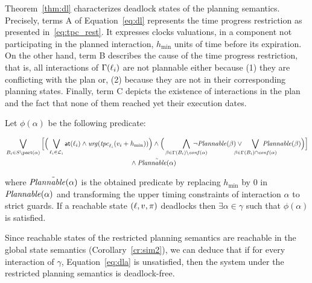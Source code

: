 Theorem~\ref{thm:dl} characterizes deadlock states of the planning semantics. Precisely,
terms A of Equation~\ref{eq:dl} represents the time progress restriction as presented
in~\ref{eq:tpc_rest}. It expresses clocks valuations, in a component not participating 
in the planned interaction, $h_{\min}$ units of time before its expiration. On the other hand,
term B describes the cause of the time progress restriction, that is, all interactions
of $\Gamma(\ell_i)$ are not plannable either because (1) they are conflicting with the plan
or, (2) because they are not in their corresponding planning states.
Finally, term C depicts the existence of interactions in the plan and the fact that none of them
reached yet their execution dates.
 
\begin{theorem}\label{thm:dla}
  Let $\phi(\alpha)$ be the following predicate:

  \begin{adjustwidth}{-10mm}{-10mm}
    \begin{equation}\label{eq:dla}
  \begin{split}
    &\bigvee_{B_i\in S\setminus\p{\alpha}}\Big[\Big(
    \bigvee_{\loc_i\in\Loc_i}\at{\loc_i}
  \wedge\urg(\tpc{\loc_i}(\val_i+h_{\min}))\Big)\wedge
    \Big(\bigwedge_{\beta\in\Gamma(B_i)\setminus\confl(\alpha)}\hspace{-8mm}
    \neg\plntxt{\beta}\vee\hspace{-5mm}\bigvee_{\beta\in\Gamma(B_i)\cap\confl(\alpha)}
\hspace{-8mm}\plntxt{\beta}\Big)\Big]\\
&\hspace{6.5cm}\wedge\tilde{\plntxt{\alpha}} 
  \end{split}
\end{equation}
  \end{adjustwidth}
  where $\tilde{\mathit{Plannable(\alpha)}}$ is the obtained predicate by replacing 
  $h_{\min}$ by 0 in $\mathit{Plannable(\alpha)}$ and transforming the upper 
  timing constraints of interaction $\alpha$ to strict guards.
  If a reachable state $(\ell,v,\pi)$ deadlocks then $\exists\alpha\in\gamma$ 
  such that $\phi(\alpha)$ is satisfied.
\end{theorem}

Since reachable states of the restricted planning semantics are reachable 
in the global state semantics (Corollary~\ref{cr:sim2}), we can deduce that if for
every interaction of $\gamma$, Equation~\ref{eq:dla} is unsatisfied, then the system
under the restricted planning semantics is deadlock-free.



